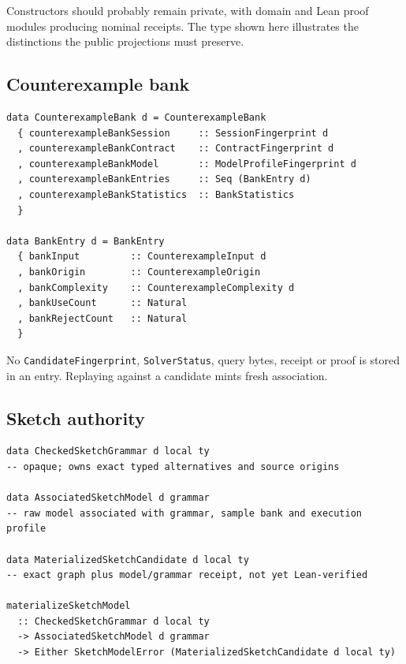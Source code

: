 \documentclass[11pt,oneside]{report}
\newcommand{\code}[1]{\texttt{#1}}
\begin{document}
Constructors should probably remain private, with domain and Lean proof modules producing nominal receipts. The type shown here illustrates the distinctions the public projections must preserve.

\subsection{Counterexample bank}

\begin{lstlisting}[language=HaskellX,caption={Counterexample bank with no cached verdict authority.},label={lst:bank}]
data CounterexampleBank d = CounterexampleBank
  { counterexampleBankSession     :: SessionFingerprint d
  , counterexampleBankContract    :: ContractFingerprint d
  , counterexampleBankModel       :: ModelProfileFingerprint d
  , counterexampleBankEntries     :: Seq (BankEntry d)
  , counterexampleBankStatistics  :: BankStatistics
  }

data BankEntry d = BankEntry
  { bankInput         :: CounterexampleInput d
  , bankOrigin        :: CounterexampleOrigin
  , bankComplexity    :: CounterexampleComplexity d
  , bankUseCount      :: Natural
  , bankRejectCount   :: Natural
  }
\end{lstlisting}

No \code{CandidateFingerprint}, \code{SolverStatus}, query bytes, receipt or proof is stored in an entry. Replaying against a candidate mints fresh association.

\subsection{Sketch authority}

\begin{lstlisting}[language=HaskellX,caption={Separation of grammar, solver model and materialized candidate.},label={lst:sketch-authority}]
data CheckedSketchGrammar d local ty
-- opaque; owns exact typed alternatives and source origins

data AssociatedSketchModel d grammar
-- raw model associated with grammar, sample bank and execution profile

data MaterializedSketchCandidate d local ty
-- exact graph plus model/grammar receipt, not yet Lean-verified

materializeSketchModel
  :: CheckedSketchGrammar d local ty
  -> AssociatedSketchModel d grammar
  -> Either SketchModelError (MaterializedSketchCandidate d local ty)
\end{lstlisting}
\end{document}
